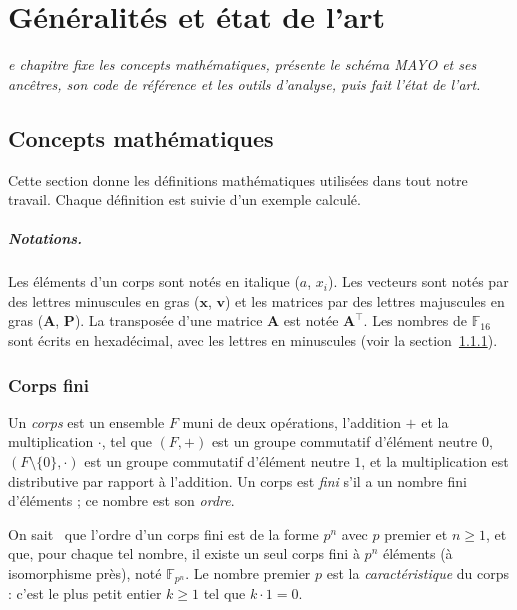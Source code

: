 \let\textcircled=\pgftextcircled
\chapter[Généralités et état de l'art]{Généralités et état de l'art}
\label{ch:etat}

\minitoc
\bigskip

\textit{e chapitre fixe les concepts mathématiques, présente le schéma MAYO et ses ancêtres, son code de référence et les outils d'analyse, puis fait l'état de l'art.}

\newpage


\section{Concepts mathématiques}\label{sec:maths}
Cette section donne les définitions mathématiques utilisées dans tout notre travail. Chaque définition est suivie d'un exemple calculé.

\paragraph{Notations.} Les éléments d'un corps sont notés en italique ($a$, $x_i$). Les vecteurs sont notés par des lettres minuscules en gras ($\mathbf{x}$, $\mathbf{v}$) et les matrices par des lettres majuscules en gras ($\mathbf{A}$, $\mathbf{P}$). La transposée d'une matrice $\mathbf{A}$ est notée $\mathbf{A}^{\top}$. Les nombres de $\mathbb{F}_{16}$ sont écrits en hexadécimal, avec les lettres en minuscules (voir la section~\ref{sec:corps}).

\subsection{Corps fini}\label{sec:corps}
\begin{definition}
Un \emph{corps} est un ensemble $F$ muni de deux opérations, l'addition $+$ et la multiplication $\cdot$, tel que $(F,+)$ est un groupe commutatif d'élément neutre $0$, $(F\setminus\{0\},\cdot)$ est un groupe commutatif d'élément neutre $1$, et la multiplication est distributive par rapport à l'addition. Un corps est \emph{fini} s'il a un nombre fini d'éléments ; ce nombre est son \emph{ordre}.
\end{definition}
On sait~\cite{lidl} que l'ordre d'un corps fini est de la forme $p^n$ avec $p$ premier et $n\ge1$, et que, pour chaque tel nombre, il existe un seul corps fini à $p^n$ éléments (à isomorphisme près), noté $\mathbb{F}_{p^n}$. Le nombre premier $p$ est la \emph{caractéristique} du corps : c'est le plus petit entier $k\ge1$ tel que $k\cdot1=0$.

